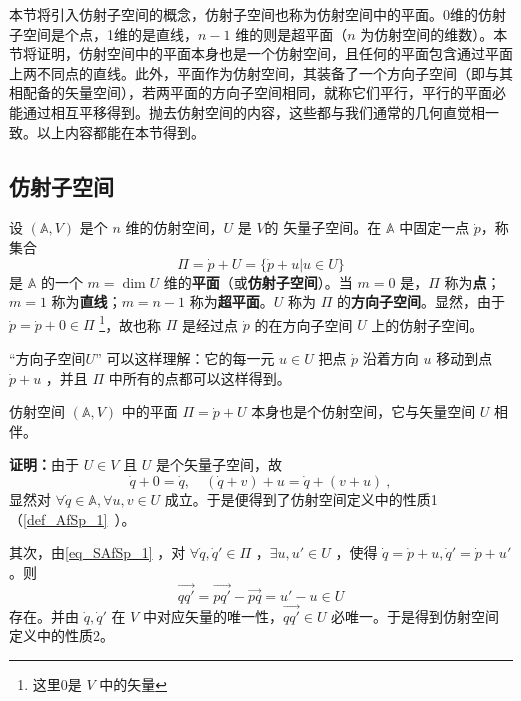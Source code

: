 
\begin{issues}
\end{issues}

本节将引入仿射子空间的概念，仿射子空间也称为仿射空间中的平面。0维的仿射子空间是个点，1维的是直线，$n-1$ 维的则是超平面（$n$ 为仿射空间的维数）。本节将证明，仿射空间中的平面本身也是一个仿射空间，且任何的平面包含通过平面上两不同点的直线。此外，平面作为仿射空间，其装备了一个方向子空间（即与其相配备的矢量空间），若两平面的方向子空间相同，就称它们平行，平行的平面必能通过相互平移得到。抛去仿射空间的内容，这些都与我们通常的几何直觉相一致。以上内容都能在本节得到。
\subsection{仿射子空间}
\begin{definition}{}\label{def_SAfSp_1}
设 $(\mathbb A,V)$ 是个 $n$ 维的仿射空间，$U$ 是 $V$的 矢量子空间。在 $\mathbb A$ 中固定一点 $\dot p$，称集合
\begin{equation}\label{eq_SAfSp_1}
\Pi=\dot p+U=\{\dot p+u|u\in U\}
\end{equation}
是 $\mathbb A$ 的一个 $m=\dim U$ 维的\textbf{平面}（或\textbf{仿射子空间}）。当 $m=0$ 是，$\Pi$ 称为\textbf{点}；$m=1$ 称为\textbf{直线}；$m=n-1$ 称为\textbf{超平面}。$U$ 称为 $\Pi$ 的\textbf{方向子空间}。显然，由于 $\dot p=\dot p+0\in \Pi$ \footnote{这里0是 $V$ 中的矢量}，故也称 $\Pi$ 是经过点 $\dot p$ 的在方向子空间 $U$ 上的仿射子空间。
\end{definition}
“方向子空间$U$” 可以这样理解：它的每一元 $u\in U$ 把点 $\dot p$ 沿着方向 $u$ 移动到点 $\dot p+u$ ，并且 $\Pi$ 中所有的点都可以这样得到。

\begin{theorem}{}
仿射空间 $(\mathbb A,V)$ 中的平面 $\Pi=\dot p+U$ 本身也是个仿射空间，它与矢量空间 $U$ 相伴。
\end{theorem}
\textbf{证明：}由于 $U\in V$ 且 $U$ 是个矢量子空间，故
\begin{equation}
\dot q+0=\dot q,\quad (\dot q+v)+u=\dot q+(v+u)~,
\end{equation}
显然对 $\forall \dot q\in\mathbb A,\forall u,v\in U$ 成立。于是便得到了仿射空间定义中的性质1（\autoref{def_AfSp_1}~）。

其次，由\autoref{eq_SAfSp_1} ，对 $\forall \dot q,\dot q'\in\Pi$ ，$\exists u,u'\in U$ ，使得 $\dot q=\dot p+u,\dot q'=\dot p+u'$。则
\begin{equation}
\overrightarrow{qq'}=\overrightarrow{pq'}-\overrightarrow{pq}=u'-u\in U
\end{equation}
存在。并由 $\dot q,\dot q'$ 在 $V$ 中对应矢量的唯一性，$\overrightarrow{qq'}\in U$ 必唯一。于是得到仿射空间定义中的性质2。

